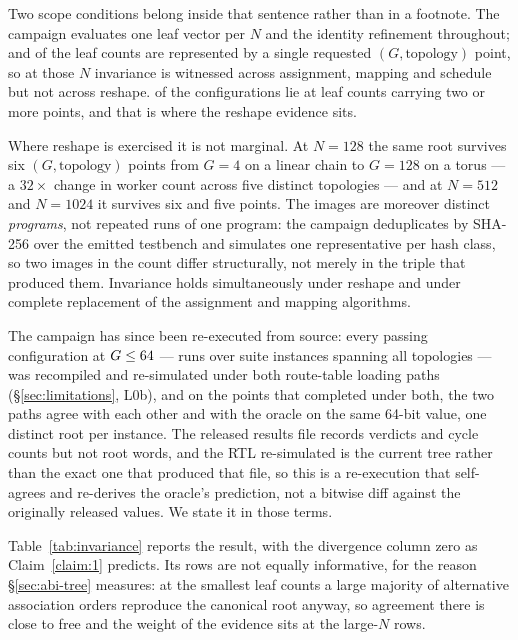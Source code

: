 \documentclass[journal,10pt]{IEEEtran}
\theoremstyle{plain}
\theoremstyle{definition}
\theoremstyle{remark}
\begin{document}
Two scope conditions belong inside that sentence rather than in a footnote.
The campaign evaluates one leaf vector per $N$ and the identity refinement
throughout; and \InvSingletonRows{} of the \InvLeafCounts{} leaf counts are
represented by a single requested $(G,\text{topology})$ point, so at those $N$
invariance is witnessed across assignment, mapping and schedule but not across
reshape. \InvMultiPoint{} of the \WallTBs{} configurations lie at leaf counts
carrying two or more points, and that is where the reshape evidence sits.

Where reshape is exercised it is not marginal. At $N{=}128$ the same root
survives six $(G,\text{topology})$ points from $G{=}4$ on a linear chain to
$G{=}128$ on a torus --- a $32\times$ change in worker count across five
distinct topologies --- and at $N{=}512$ and $N{=}1024$ it survives six and
five points. The \InvAttempted{} images are moreover distinct \emph{programs},
not repeated runs of one program: the campaign deduplicates by SHA-256 over
the emitted testbench and simulates one representative per hash class, so two
images in the count differ structurally, not merely in the triple that
produced them. Invariance holds simultaneously under reshape and under
complete replacement of the assignment and mapping algorithms.

The campaign has since been re-executed from source: every passing
configuration at $G \le 64$ --- \RouteRuns{} runs over
\RouteReexecInst{} suite instances spanning all \RouteTopoCount{} topologies
--- was recompiled and re-simulated under both route-table loading paths
(\S\ref{sec:limitations}, L0b), and on the \RouteReexec{} points that completed
under both, the two paths agree with each other and with the oracle on the same
64-bit value, one distinct root per instance. The released results file records
verdicts and cycle counts but not root words, and the RTL re-simulated is the
current tree rather than the exact one that produced that file, so this is a
re-execution that self-agrees and re-derives the oracle's prediction, not a
bitwise diff against the originally released values. We state it in those
terms.

Table~\ref{tab:invariance} reports the result, with the divergence column zero
as Claim~\ref{claim:1} predicts. Its rows are not equally informative, for the
reason \S\ref{sec:abi-tree} measures: at the smallest leaf counts a large
majority of alternative association orders reproduce the canonical root
anyway, so agreement there is close to free and the weight of the evidence
sits at the large-$N$ rows.
\end{document}
